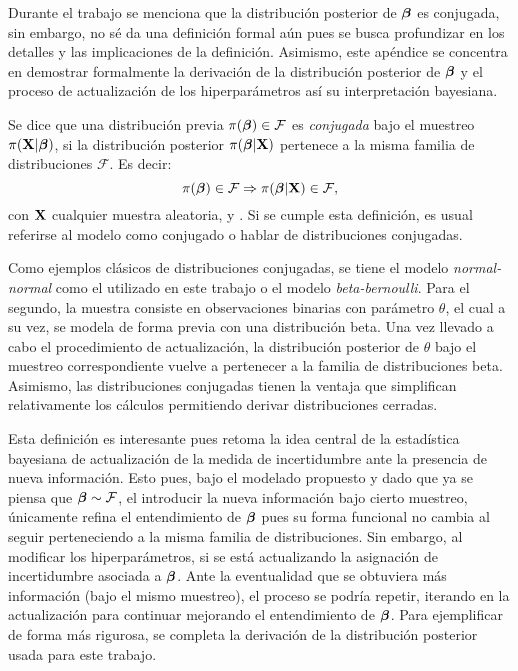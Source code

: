 \documentclass[../../Main/Main.tex]{subfiles}
\begin{document}
Durante el trabajo se menciona que la distribución posterior de $\bm{\beta}$ es conjugada, sin embargo, no sé da una definición formal aún pues se busca profundizar en los detalles y las implicaciones de la definición. Asimismo, este apéndice se concentra en demostrar formalmente la derivación de la distribución posterior de $\bm{\beta}$ y el proceso de actualización de los hiperparámetros así su interpretación bayesiana. \\

\begin{definition}
Se dice que una distribución previa $\pi(\bm{\beta})\in\mathcal{F}$  es \emph{conjugada} bajo el muestreo $\pi(\mathbf{X}|\bm{\beta})$, si la distribución posterior $\pi(\bm{\beta}|\mathbf{X})$ pertenece a la misma familia de distribuciones $\mathcal{F}$. Es decir: $$\pi(\bm{\beta}) \in \mathcal{F} \Rightarrow \pi(\bm{\beta}|\mathbf{X}) \in \mathcal{F}, $$ con $\mathbf{X}$ cualquier muestra aleatoria, \citet{mendoza2011estadistica} y \citet{barber2010bayesian}. Si se cumple esta definición, es usual referirse al modelo como conjugado o hablar  de distribuciones conjugadas.
\end{definition}
Como ejemplos clásicos de distribuciones conjugadas, se tiene el modelo \textit{normal-normal} como el utilizado en este trabajo o el modelo \textit{beta-bernoulli}. Para el segundo, la muestra consiste en observaciones binarias con parámetro $\theta$, el cual a su vez, se modela de forma previa con una distribución beta. Una vez llevado a cabo el procedimiento de actualización, la distribución posterior de $\theta$ bajo el muestreo correspondiente vuelve a pertenecer a la familia de distribuciones beta. Asimismo, las distribuciones conjugadas tienen la ventaja que simplifican relativamente los cálculos permitiendo derivar distribuciones cerradas.

Esta definición es interesante pues retoma la idea central de la estadística bayesiana de actualización de la medida de incertidumbre ante la presencia de nueva información. Esto pues, bajo el modelado propuesto y dado que ya se piensa que $\bm{\beta}\sim\mathcal{F}$, el introducir la nueva información bajo cierto muestreo, únicamente refina el entendimiento de $\bm{\beta}$ pues su forma funcional no cambia al seguir perteneciendo a la misma familia de distribuciones. Sin embargo, al modificar los hiperparámetros, si se está actualizando la asignación de incertidumbre asociada a $\bm{\beta}$.  Ante la eventualidad que se obtuviera más información (bajo el mismo muestreo), el proceso se podría repetir, iterando en la actualización para continuar mejorando el entendimiento de $\bm{\beta}$. Para ejemplificar de forma más rigurosa, se completa la derivación de la distribución posterior usada para este trabajo.\\
\end{document}
